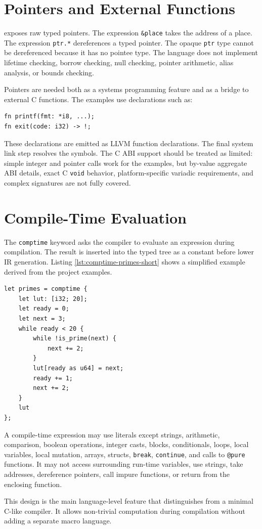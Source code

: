 \section{Pointers and External Functions}

\epl{} exposes raw typed pointers. The expression \texttt{\&place} takes the
address of a place. The expression \texttt{ptr.*} dereferences a typed pointer.
The opaque \texttt{ptr} type cannot be dereferenced because it has no pointee
type. The language does not implement lifetime checking, borrow checking, null
checking, pointer arithmetic, alias analysis, or bounds checking.

Pointers are needed both as a systems programming feature and as a bridge to
external C functions. The examples use declarations such as:

\begin{lstlisting}[language=EPL,caption={External declarations}]
fn printf(fmt: *i8, ...);
fn exit(code: i32) -> !;
\end{lstlisting}

These declarations are emitted as LLVM function declarations. The final system
link step resolves the symbols. The C ABI support should be treated as limited:
simple integer and pointer calls work for the examples, but by-value aggregate
ABI details, exact C \texttt{void} behavior, platform-specific variadic
requirements, and complex signatures are not fully covered.

\section{Compile-Time Evaluation}

The \texttt{comptime} keyword asks the compiler to evaluate an expression during
compilation. The result is inserted into the typed tree as a constant before
lower IR generation. Listing \ref{lst:comptime-primes-short} shows a simplified
example derived from the project examples.

\begin{lstlisting}[language=EPL,caption={Computing values at compile time},label={lst:comptime-primes-short}]
let primes = comptime {
	let lut: [i32; 20];
	let ready = 0;
	let next = 3;
	while ready < 20 {
		while !is_prime(next) {
			next += 2;
		}
		lut[ready as u64] = next;
		ready += 1;
		next += 2;
	}
	lut
};
\end{lstlisting}

A compile-time expression may use literals except strings, arithmetic,
comparison, boolean operations, integer casts, blocks, conditionals, loops,
local variables, local mutation, arrays, structs, \texttt{break},
\texttt{continue}, and calls to \texttt{@pure} functions. It may not access
surrounding run-time variables, use strings, take addresses, dereference
pointers, call impure functions, or return from the enclosing function.

This design is the main language-level feature that distinguishes \epl{} from a
minimal C-like compiler. It allows non-trivial computation during compilation
without adding a separate macro language.
